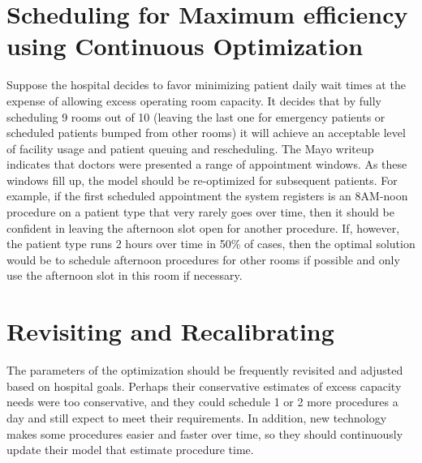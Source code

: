 \documentclass[]{article}
\begin{document}
\begin{large}
\section{Scheduling for Maximum efficiency using Continuous Optimization}

Suppose the hospital decides to favor minimizing patient daily wait times at the expense of allowing excess operating room capacity. It decides that by fully scheduling 9 rooms out of 10 (leaving the last one for emergency patients or scheduled patients bumped from other rooms) it will achieve an acceptable level of facility usage and patient queuing and rescheduling. The Mayo writeup indicates that doctors were presented a range of appointment windows. As these windows fill up, the model should be re-optimized for subsequent patients. For example, if the first scheduled appointment the system registers is an 8AM-noon procedure on a patient type that very rarely goes over time, then it should be confident in leaving the afternoon slot open for another procedure. If, however, the patient type runs 2 hours over time in 50\% of cases, then the optimal solution would be to schedule afternoon procedures for other rooms if possible and only use the afternoon slot in this room if necessary. 

\section{Revisiting and Recalibrating}

The parameters of the optimization should be frequently revisited and adjusted based on hospital goals. Perhaps their conservative estimates of excess capacity needs were too conservative, and they could schedule 1 or 2 more procedures a day and still expect to meet their requirements. In addition, new technology makes some procedures easier and faster over time, so they should continuously update their model that estimate procedure time. 



\end{large}
\end{document}
